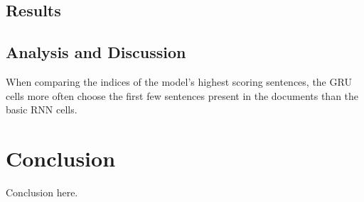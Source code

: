 \documentclass[11pt]{article}
\begin{document}
    \subsection{Results}

    \subsection{Analysis and Discussion}
	When comparing the indices of the model's highest scoring sentences, the GRU cells more often choose the first few sentences present in the documents than the basic RNN cells.

\section{Conclusion}
	Conclusion here.



\end{document}
